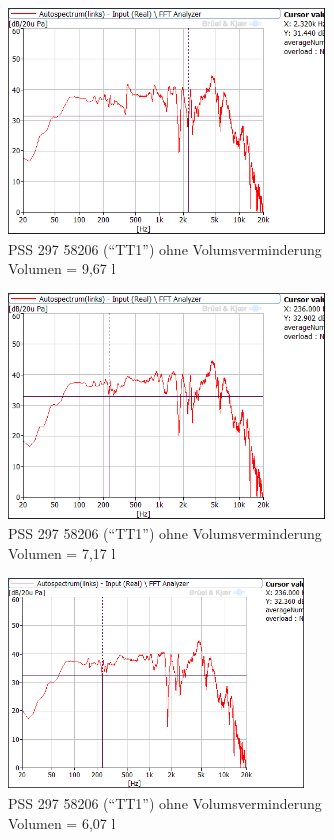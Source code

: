\begin{figure} [H]
	\centering
	\includegraphics[width=0.75\textwidth]{img/Optimierung/TT/TT1_Styro_9-67l.png}
	\caption{PSS 297 58206 (\enquote{TT1}) ohne Volumsverminderung \\Volumen = 9,67 l}
	\label{fig:4.4.3.4}
\end{figure}

\begin{figure} [H]
	\centering
	\includegraphics[width=0.75\textwidth]{img/Optimierung/TT/TT1_Styro_7-17l.png}
	\caption{PSS 297 58206 (\enquote{TT1}) ohne Volumsverminderung \\Volumen = 7,17 l}
	\label{fig:4.4.3.5}
\end{figure}

\begin{figure} [H]
	\centering
	\includegraphics[width=0.7\textwidth]{img/Optimierung/TT/TT1_Styro_6-07l.png}
	\caption{PSS 297 58206 (\enquote{TT1}) ohne Volumsverminderung \\Volumen = 6,07 l}
	\label{fig:4.4.3.6}
\end{figure}

